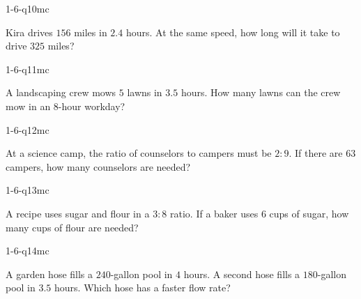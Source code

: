 \begin{practiceQuestion}{1-6-q10}{mc}
\begin{questionText}
Kira drives $156$ miles in $2.4$ hours. At the same speed, how long will it take to drive $325$ miles?
\end{questionText}
\end{practiceQuestion}

\begin{practiceQuestion}{1-6-q11}{mc}
\begin{questionText}
A landscaping crew mows $5$ lawns in $3.5$ hours. How many lawns can the crew mow in an $8$-hour workday?
\end{questionText}
\end{practiceQuestion}

\begin{practiceQuestion}{1-6-q12}{mc}
\begin{questionText}
At a science camp, the ratio of counselors to campers must be $2 : 9$. If there are $63$ campers, how many counselors are needed?
\end{questionText}
\end{practiceQuestion}

\begin{practiceQuestion}{1-6-q13}{mc}
\begin{questionText}
A recipe uses sugar and flour in a $3 : 8$ ratio. If a baker uses $6$ cups of sugar, how many cups of flour are needed?
\end{questionText}
\end{practiceQuestion}

\begin{practiceQuestion}{1-6-q14}{mc}
\begin{questionText}
A garden hose fills a $240$-gallon pool in $4$ hours. A second hose fills a $180$-gallon pool in $3.5$ hours. Which hose has a faster flow rate?
\end{questionText}
\end{practiceQuestion}

